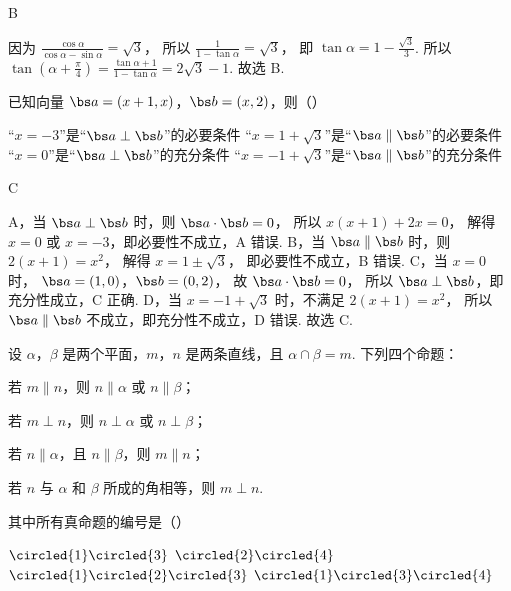 \begin{answer}
B
\end{answer}

\begin{solution}
因为
\(\frac{\cos \alpha}{\cos \alpha-\sin \alpha}=\sqrt{3}\)，
所以
\(\frac{1}{1-\tan \alpha}=\sqrt{3}\)，
即
\(\tan \alpha=1-\frac{\sqrt{3}}{3}\).
所以
\(\tan \left( \alpha+\frac{\pi}{4} \right)=\frac{\tan \alpha+1}{1-\tan \alpha}=2\sqrt{3}-1\).
故选 B.
\end{solution}

\begin{problem}
已知向量 \( \bs a=(x+1,x) \)，\( \bs b=(x,2) \)，则（\quad）

\choices
    {“\( x=-3 \)”是“\( \bs a\perp \bs b \)”的必要条件}
    {“\( x=1+\sqrt{3} \)”是“\( \bs a\parallel\bs b \)”的必要条件}
    {“\( x=0 \)”是“\( \bs a\perp \bs b \)”的充分条件}
    {“\( x=-1+\sqrt{3} \)”是“\( \bs a\parallel\bs b \)”的充分条件}
\end{problem}

\begin{answer}
C
\end{answer}

\begin{solution}
A，当 \( \bs a\perp \bs b \) 时，则
\(\bs a\cdot \bs b=0\)，
所以
\(x(x+1)+2x=0\)，
解得 \( x=0 \) 或 \( x=-3 \)，即必要性不成立，A 错误.
B，当 \( \bs a\parallel\bs b \) 时，则
\(2(x+1)=x^2\)，
解得
\(x=1\pm \sqrt{3}\)，
即必要性不成立，B 错误.
C，当 \( x=0 \) 时，
\(\bs a=(1,0)\)，\(\bs b=(0,2)\)，
故
\(\bs a\cdot \bs b=0\)，
所以 \( \bs a\perp \bs b \)，即充分性成立，C 正确.
D，当 \( x=-1+\sqrt{3} \) 时，不满足
\(2(x+1)=x^2\)，
所以 \( \bs a\parallel\bs b \) 不成立，即充分性不成立，D 错误.
故选 C.
\end{solution}

\begin{problem}
设 \(\alpha\)，\(\beta\) 是两个平面，\(m\)，\(n\) 是两条直线，且 \( \alpha\cap\beta=m \). 下列四个命题：

\begin{circlelist}
\item 若 \( m\parallel n \)，则 \( n\parallel\alpha \) 或 \( n\parallel\beta \)；
\item 若 \( m\perp n \)，则 \( n\perp \alpha \) 或 \( n\perp \beta \)；
\item 若 \( n\parallel\alpha \)，且 \( n\parallel\beta \)，则 \( m\parallel n \)；
\item 若 \( n \) 与 \( \alpha \) 和 \( \beta \) 所成的角相等，则 \( m\perp n \).
\end{circlelist}

其中所有真命题的编号是（\quad）

\choices
    {\( \circled{1}\circled{3} \)}
    {\( \circled{2}\circled{4} \)}
    {\( \circled{1}\circled{2}\circled{3} \)}
    {\( \circled{1}\circled{3}\circled{4} \)}
\end{problem}

